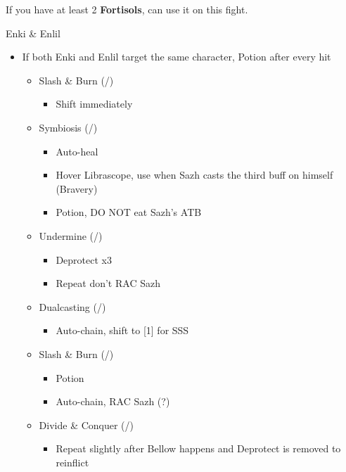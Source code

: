 If you have at least 2 \textbf{Fortisols}, can use it on this fight.
\vfill
\ 

\renewcommand{\first}{[1] Slash \& Burn (\rav/\com)}
\renewcommand{\second}{[2] Symbiosis (\med/\syn)}
\renewcommand{\third}{[3] Tide Turner (\sab/\syn)}
\renewcommand{\fourth}{[4] Dualcasting (\rav/\rav)}
\renewcommand{\fifth}{[5] Undermine (\sab/\rav)}
\renewcommand{\sixth}{[6] Divide \& Conquer (\sab/\com)}
\begin{battle}[1:39]{Enki \& Enlil}
		\begin{itemize}
			\item If both Enki and Enlil target the same character, Potion after every hit
			      \begin{itemize}
			\item \first
			      \begin{itemize}
				      \item Shift immediately
			      \end{itemize}
			\item \second
			      \begin{itemize}
			      	  \item Auto-heal
				      \item Hover Librascope, use when Sazh casts the third buff on himself (Bravery)
				      \item Potion, DO NOT eat Sazh's ATB
			      \end{itemize}
			\item \fifth
			      \begin{itemize}
				      \item Deprotect x3
				      \item Repeat don't RAC Sazh
			      \end{itemize}
			\item \fourth
			      \begin{itemize}
				      \item Auto-chain, shift to [1] for SSS
			      \end{itemize}
			\item \first
			      \begin{itemize}
				      \item Potion
				      \item Auto-chain, RAC Sazh (?)
			      \end{itemize}
			\item \sixth
			      \begin{itemize}
				      \item Repeat slightly after Bellow happens and Deprotect is removed to reinflict

\end{itemize}
\end{itemize}
\end{itemize}
\end{battle}
